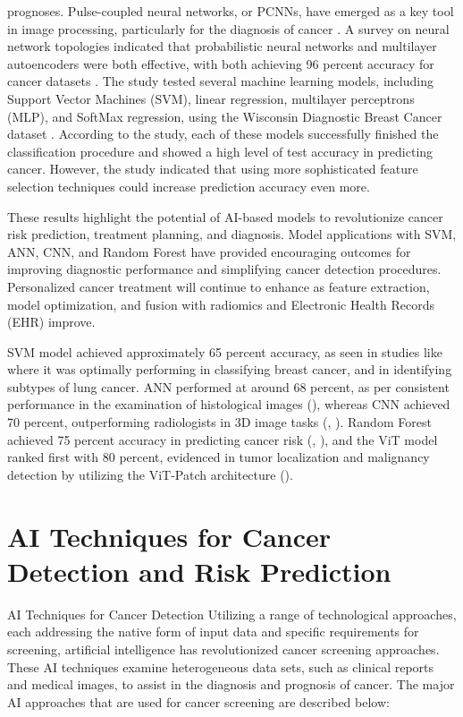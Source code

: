 \documentclass[conference]{IEEEtran}
\begin{document}
prognoses. Pulse-coupled neural networks, or PCNNs, have emerged as a key tool in image processing, particularly for the diagnosis of cancer \cite{1}. A survey on neural network topologies indicated that probabilistic neural networks and multilayer autoencoders were both effective, with both achieving 96 percent accuracy for cancer datasets \cite{29}. The study tested several machine learning models, including Support Vector Machines (SVM), linear regression, multilayer perceptrons (MLP), and SoftMax regression, using the Wisconsin Diagnostic Breast Cancer dataset \cite{29}. According to the study, each of these models successfully finished the classification procedure and showed a high level of test accuracy in predicting cancer. However, the study indicated that using more sophisticated feature selection techniques could increase prediction accuracy even more.

These results highlight the potential of AI-based models to revolutionize cancer risk prediction, treatment planning, and diagnosis. Model applications with SVM, ANN, CNN, and Random Forest have provided encouraging outcomes for improving diagnostic performance and simplifying cancer detection procedures. Personalized cancer treatment will continue to enhance as feature extraction, model optimization, and fusion with radiomics and Electronic Health Records (EHR) improve.

SVM model achieved approximately 65 percent accuracy, as seen in studies like \cite{17} where it was optimally performing in classifying breast cancer, and \cite{16} in identifying subtypes of lung cancer. ANN performed at around 68 percent, as per consistent performance in the examination of histological images (\cite{8}), whereas CNN achieved 70 percent, outperforming radiologists in 3D image tasks (\cite{3}, \cite{9}). Random Forest achieved 75 percent accuracy in predicting cancer risk (\cite{22}, \cite{5}), and the ViT model ranked first with 80 percent, evidenced in tumor localization and malignancy detection by utilizing the ViT-Patch architecture 
(\cite{14}).

\pgfplotsset{compat=1.18}  %




\section{  AI Techniques for Cancer Detection and Risk Prediction}

AI Techniques for Cancer Detection
Utilizing a range of technological approaches, each addressing the native form of input data and specific requirements for screening, artificial intelligence has revolutionized cancer screening approaches. These AI techniques examine heterogeneous data sets, such as clinical reports and medical images, to assist in the diagnosis and prognosis of cancer. The major AI approaches that are used for cancer screening are described below:
\end{document}
